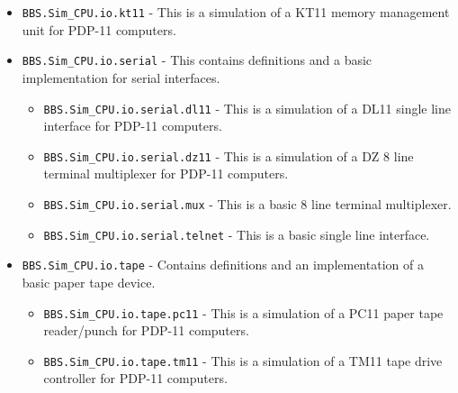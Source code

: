 \documentclass[10pt, openany]{book}
\newcommand{\package}[1]{\texttt{#1}}
\begin{document}
\begin{itemize}
\begin{itemize}
\begin{itemize}
      \begin{itemize}
        \item \package{BBS.Sim\_CPU.io.disk.floppy} - This contains generic floppy and hard disk controllers.
        \item \package{BBS.Sim\_CPU.io.disk.rk11} - This is a simulation of a RK11 controller for RK05 disks for PDP-11 computers.
        \item \package{BBS.Sim\_CPU.io.disk.rk611} - This is a simulation of a RK611 controller for RK07 disks (RK06 disks are not implemented) for PDP-11 computers.
      \end{itemize}
      \item \package{BBS.Sim\_CPU.io.kt11} - This is a simulation of a KT11 memory management unit for PDP-11 computers.
      \item \package{BBS.Sim\_CPU.io.serial} - This contains definitions and a basic implementation for serial interfaces.
      \begin{itemize}
        \item \package{BBS.Sim\_CPU.io.serial.dl11} - This is a simulation of a DL11 single line interface for PDP-11 computers.
        \item \package{BBS.Sim\_CPU.io.serial.dz11} - This is a simulation of a DZ 8 line terminal multiplexer for PDP-11 computers.
        \item \package{BBS.Sim\_CPU.io.serial.mux} - This is a basic 8 line terminal multiplexer.
        \item \package{BBS.Sim\_CPU.io.serial.telnet} - This is a basic single line interface.
      \end{itemize}
      \item \package{BBS.Sim\_CPU.io.tape} - Contains definitions and an implementation of a basic paper tape device.
      \begin{itemize}
        \item \package{BBS.Sim\_CPU.io.tape.pc11} - This is a simulation of a PC11 paper tape reader/punch for PDP-11 computers.
        \item \package{BBS.Sim\_CPU.io.tape.tm11} - This is a simulation of a TM11 tape drive controller for PDP-11 computers.
      \end{itemize}
    \end{itemize}
  \end{itemize}
\end{itemize}

\end{document}
